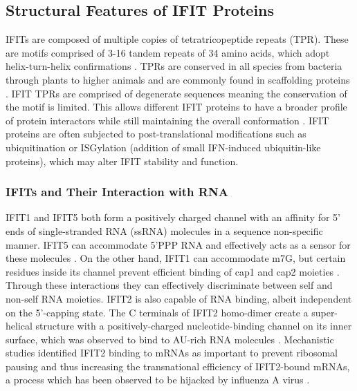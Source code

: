 \subsection{Structural Features of IFIT Proteins} \label{subsec:Structural Features of IFIT Proteins}
IFITs are composed of multiple copies of tetratricopeptide repeats (TPR). These are motifs comprised of 3-16 tandem repeats of 34 amino acids, which adopt helix-turn-helix confirmations \cite{DAndrea2003TPRHelix}. TPRs are conserved in all species from bacteria through plants to higher animals and are commonly found in scaffolding proteins \cite{Vladimer2014IFITs:Proteins}. IFIT TPRs are comprised of degenerate sequences meaning the conservation of the motif is limited. This allows different IFIT proteins to have a broader profile of protein interactors while still maintaining the overall conformation \cite{Fensterl2015Interferon-InducedPathogenesis}. IFIT proteins are often subjected to post-translational modifications such as ubiquitination or ISGylation (addition of small IFN-induced ubiquitin-like proteins), which may alter IFIT stability and function.

\subsubsection{IFITs and Their Interaction with RNA} \label{IFITs and Their Interaction with RNA}
IFIT1 and IFIT5 both form a positively charged channel with an affinity for 5' ends of single-stranded RNA (ssRNA) molecules in a sequence non-specific manner. IFIT5 can accommodate 5'PPP RNA and effectively acts as a sensor for these molecules \cite{Abbas2013StructuralProteins, Pichlmair2011IFIT1RNA}. On the other hand, IFIT1 can accommodate m7G, but certain residues inside its channel prevent efficient binding of cap1 and cap2 moieties \cite{Diamond2014IFIT1:Translation, Mears2018BetterResponse}. Through these interactions they can effectively discriminate between self and non-self RNA moieties. IFIT2 is also capable of RNA binding, albeit independent on the 5'-capping state. The C terminals of IFIT2 homo-dimer create a super-helical structure with a positively-charged nucleotide-binding channel on its inner surface, which was observed to bind to AU-rich RNA molecules \cite{Yang2012CrystalMechanisms}. Mechanistic studies identified IFIT2 binding to mRNAs as important to prevent ribosomal pausing and thus increasing the transnational efficiency of IFIT2-bound mRNAs, a process which has been observed to be hijacked by influenza A virus \cite{Tran2020InfluenzaMRNAs}.

